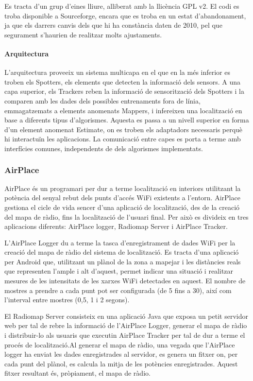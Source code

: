 Es tracta d’un grup d’eines lliure, alliberat amb la llicència GPL v2. El codi es troba disponible a Sourceforge, encara que es troba en un estat d’abandonament, ja que els darrers canvis dels que hi ha constància daten de 2010, pel que segurament s’haurien de realitzar molts ajustaments.

\paragraph{Arquitectura}

L'arquitectura proveeix un sistema multicapa en el que en la més inferior es troben els Spotters, els elements que detecten la informació dels sensors. A una capa superior, els Trackers reben la informació de sensorització dels Spotters i la comparen amb les dades dels possibles entrenaments fora de línia, emmagatzemats a elements anomenats Mappers, i infereixen una localització en base a diferents tipus d’algorismes. Aquesta es passa a un nivell superior en forma d'un element anomenat Estimate, on es troben els adaptadors necessaris perquè hi interactuïn les aplicacions. La comunicació entre capes es porta a terme amb interfícies comunes, independents de dels algorismes implementats.

\subsubsection{AirPlace}

AirPlace \cite{laoudias} és un programari per dur a terme localització en interiors utilitzant la potència del senyal rebut dels punts d'accés WiFi existents a l'entorn. AirPlace gestiona el cicle de vida sencer d'una aplicació de localització, des de la creació del mapa de ràdio, fins la localització de l'usuari final. Per això es divideix en tres aplicacions diferents: AirPlace logger, Radiomap Server i AirPlace Tracker.

L'AirPlace Logger du a terme la tasca d'enregistrament de dades WiFi per la creació del mapa de ràdio del sistema de localització. Es tracta d'una aplicació per Android que, utilitzant un plànol de la zona a mapejar i les distàncies reals que representen l'ample i alt d'aquest, permet indicar una situació i realitzar mesures de les intensitats de les xarxes WiFi detectades en aquest. El nombre de mostres a prendre a cada punt pot ser configurada (de 5 fins a 30), així com l'interval entre mostres (0,5, 1 i 2 segons).

El Radiomap Server consisteix en una aplicació Java que exposa un petit servidor web per tal de rebre la informació de l'AirPlace Logger, generar el mapa de ràdio i distribuir-lo als usuaris que executin AirPlace Tracker per tal de dur a terme el procés de localització.Al generar el mapa de ràdio, una vegada que l'AirPlace logger ha enviat les dades enregistrades al servidor, es genera un fitxer on, per cada punt del plànol, es calcula la mitja de les potències enregistrades. Aquest fitxer resultant és, pròpiament, el mapa de ràdio.

